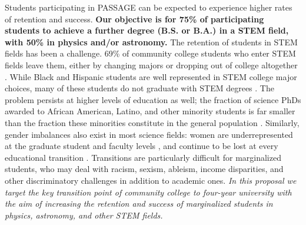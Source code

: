\documentclass[12pt]{article}
\begin{document}
Students participating in PASSAGE can be expected to experience higher rates of retention and success. %
{\bf Our objective is for  75\% of participating students to achieve a further degree (B.S. or B.A.) in a STEM field, with 50\%  in physics and/or  astronomy.} %
The retention of students in STEM fields has been a challenge.  69\% of community college students who enter STEM fields leave them, either by changing majors or dropping out of college altogether \citep{NCES}.  While Black and Hispanic students are well represented in STEM college major choices, many of these students do not graduate with STEM degrees \citep{Ma15}.  The problem persists at higher levels of education as well; the fraction of science PhDs awarded to African American, Latino, and other minority students is far smaller than the fraction these minorities constitute in the general population \citep{NSF06,Ivie18}.   Similarly, gender imbalances also exist in most science fields: women are underrepresented at the graduate student and faculty levels \citep{NSF04,Ivie18}, and continue to be lost at every educational transition \citep{NAP}. 	Transitions are particularly difficult for marginalized students, who may deal with racism, sexism, ableism, income disparities, and other discriminatory challenges in addition to academic ones.  {\em In this proposal we target the key transition point of community college to four-year university with the aim of increasing the retention and success of marginalized students in physics, astronomy, and other STEM fields.   }





\end{document}
